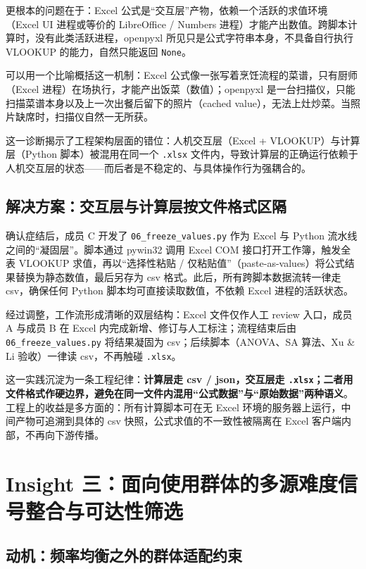 \documentclass[12pt, a4paper]{article}
\begin{document}
更根本的问题在于：Excel 公式是“交互层”产物，依赖一个活跃的求值环境（Excel UI 进程或等价的 LibreOffice / Numbers 进程）才能产出数值。跨脚本计算时，没有此类活跃进程，openpyxl 所见只是公式字符串本身，不具备自行执行 VLOOKUP 的能力，自然只能返回 \texttt{None}。

可以用一个比喻概括这一机制：Excel 公式像一张写着烹饪流程的菜谱，只有厨师（Excel 进程）在场执行，才能产出饭菜（数值）；openpyxl 是一台扫描仪，只能扫描菜谱本身以及上一次出餐后留下的照片（cached value），无法上灶炒菜。当照片缺席时，扫描仪自然一无所获。

这一诊断揭示了工程架构层面的错位：人机交互层（Excel + VLOOKUP）与计算层（Python 脚本）被混用在同一个 \texttt{.xlsx} 文件内，导致计算层的正确运行依赖于人机交互层的状态——而后者是不稳定的、与具体操作行为强耦合的。

\subsection{解决方案：交互层与计算层按文件格式区隔}

确认症结后，成员 C 开发了 \texttt{06\_freeze\_values.py} 作为 Excel 与 Python 流水线之间的“凝固层”。脚本通过 pywin32 调用 Excel COM 接口打开工作簿，触发全表 VLOOKUP 求值，再以“选择性粘贴 / 仅粘贴值”（paste-as-values）将公式结果替换为静态数值，最后另存为 csv 格式。此后，所有跨脚本数据流转一律走 csv，确保任何 Python 脚本均可直接读取数值，不依赖 Excel 进程的活跃状态。

经过调整，工作流形成清晰的双层结构：Excel 文件仅作人工 review 入口，成员 A 与成员 B 在 Excel 内完成新增、修订与人工标注；流程结束后由 \texttt{06\_freeze\_values.py} 将结果凝固为 csv；后续脚本（ANOVA、SA 算法、Xu \& Li 验收）一律读 csv，不再触碰 \texttt{.xlsx}。

这一实践沉淀为一条工程纪律：\textbf{计算层走 csv / json，交互层走 \texttt{.xlsx}；二者用文件格式作硬边界，避免在同一文件内混用“公式数据”与“原始数据”两种语义}。工程上的收益是多方面的：所有计算脚本可在无 Excel 环境的服务器上运行，中间产物可追溯到具体的 csv 快照，公式求值的不一致性被隔离在 Excel 客户端内部，不再向下游传播。

\section{Insight 三：面向使用群体的多源难度信号整合与可达性筛选}
\label{sec:multi-signal}

\subsection{动机：频率均衡之外的群体适配约束}
\end{document}
